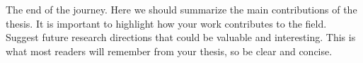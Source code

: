The end of the journey.
Here we should summarize the main contributions of the thesis.
It is important to highlight how your work contributes to the field.
Suggest future research directions that could be valuable and interesting.
This is what most readers will remember from your thesis, so be clear and concise.

\lipsum[8]
